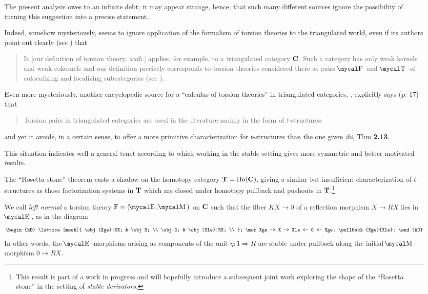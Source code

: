 \begin{remark}\label{is.it.true.in.trcats}
The present analysis owes to \cite{RT,CHK,Beligiannisreiten} an infinite debt; it may appear strange, hence, that such many different sources ignore the possibility of turning this suggestion into a precise statement.

Indeed, somehow mysteriously, \cite[\S \textbf{4}]{RT} seems to ignore application of the formalism of torsion theories to the triangulated world, even if its authors point out clearly (see \cite[Remark \textbf{4.11.(2)}]{RT}) that
\begin{quote}
It [our definition of torsion theory, \emph{auth.}] applies, for example, to a triangulated category $\textbf{C}$. Such a category has only weak kernels and weak cokernels and our definition precisely corresponds to torsion theories considered there as pairs $\F$ and $\TT$ of colocalizing and localizing subcategories (see \cite{HPS}).
\end{quote}
Even more mysteriously, another encyclopedic source for a ``calculus of torsion theories'' in triangulated categories, \cite{Beligiannisreiten}, explicitly says (p\@. 17) that
\begin{quote}
Torsion pairs in triangulated categories are used in the literature mainly in the form of $t$\hyp{}structures.
\end{quote}
and yet it avoids, in a certain sense, to offer a more primitive characterization for $t$\hyp{}structures than the one given \emph{ibi}, Thm \textbf{2.13}.

This situation indicates well a general tenet according to which working in the stable setting gives more symmetric and better motivated results. 

The ``Rosetta stone'' theorem casts a shadow on the homotopy category $\textbf{T}=\text{Ho}(\textbf{C})$, giving a similar but insufficient characterization of $t$\hyp{}structures as those factorization systems in $\textbf{T}$ which are closed under homotopy pullback and pushouts in $\textbf{T}$.\footnote{This result is part of a work in progress \cite{tderivators} and will hopefully introduce a subsequent joint work exploring the shape of the ``Rosetta stone'' in the setting of \emph{stable derivators}.}
\end{remark}
\begin{definition}\label{normal} We call \emph{left normal} a torsion theory $\fF=(\EE,\MM)$ on $\textbf{C}$ such that the fiber $KX\to 0$ of a reflection morphism $X\to RX$ lies in $\EE$, as in the diagram 
\[
\begin{kD}
\lattice[mesh]{
	\obj (Xge):KX; & \obj X; \\
	\obj 0; & \obj (Xle):RX; \\
};
\mor Xge -> X -> Xle <- 0 <- Xge;
\pullback{Xge}{Xle};
\end{kD}
\]
In other words, the $\EE$\hyp{}morphisms arising as components of the unit $\eta\colon 1\Rightarrow R$ are stable under pullback along the initial $\MM$\hyp{}morphism $0\to RX$.
\end{definition}
